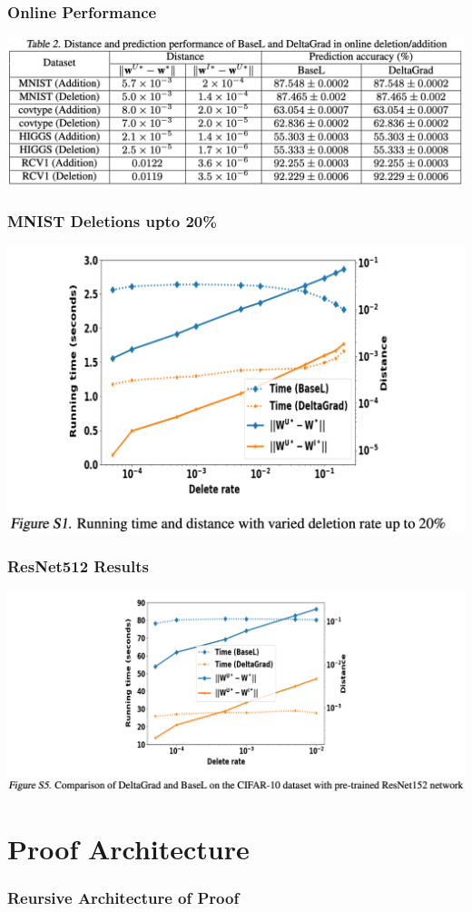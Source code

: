 \documentclass[pdf]{beamer}
\begin{document}
\begin{frame}
  \frametitle{Online Performance}
  \label{Online-Performance}
  \begin{center}
    \includegraphics[width=\textwidth]{images/Online Results.png}
  \end{center}
\end{frame}

\begin{frame}
  \frametitle{MNIST Deletions upto 20\%}
  \label{large-deletions}
  \begin{center}
    \includegraphics[width=\textwidth]{images/large deletions.png}
  \end{center}
\end{frame}
\begin{frame}
  \frametitle{ResNet512 Results}
  \label{resnet-results}
  \begin{center}
    \includegraphics[width=\textwidth]{images/resnet results.png}
  \end{center}
\end{frame}

\section{Proof Architecture}
\begin{frame}
  \label{architecture}
  \frametitle{Reursive Architecture of Proof}
  \begin{center}
  \scalebox{0.59}{
    
  }
  \end{center}  
\end{frame}
\end{document}
